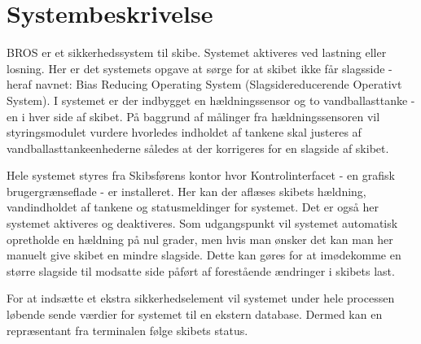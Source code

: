 \chapter{Systembeskrivelse}
BROS er et sikkerhedssystem til skibe. Systemet aktiveres ved lastning eller losning. Her er det systemets opgave at sørge for at skibet ikke får slagsside - heraf navnet: Bias Reducing Operating System (Slagsidereducerende Operativt System).
I systemet er der indbygget en hældningssensor og to vandballasttanke - en i hver side af skibet. På baggrund af målinger fra hældningssensoren vil styringsmodulet vurdere hvorledes indholdet af tankene skal justeres af vandballasttankeenhederne således at der korrigeres for en slagside af skibet.

Hele systemet styres fra Skibsførens kontor hvor Kontrolinterfacet - en grafisk brugergrænseflade - er installeret. Her kan der aflæses skibets hældning, vandindholdet af tankene og statusmeldinger for systemet. Det er også her systemet aktiveres og deaktiveres.
Som udgangspunkt vil systemet automatisk opretholde en hældning på nul grader, men hvis man ønsker det kan man her manuelt give skibet en mindre slagside. Dette kan gøres for at imødekomme en større slagside til modsatte side påført af forestående ændringer i skibets last.

For at indsætte et ekstra sikkerhedselement vil systemet under hele processen løbende sende værdier for systemet til en ekstern database. Dermed kan en repræsentant fra terminalen følge skibets status.